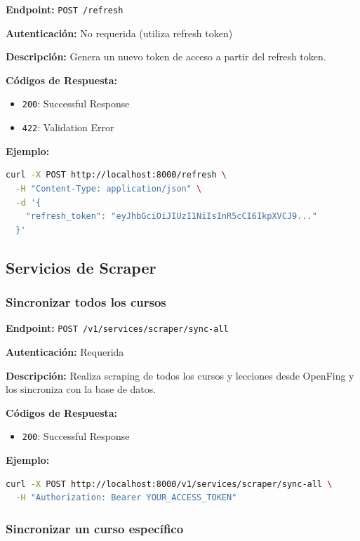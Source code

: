 \textbf{Endpoint:} \texttt{POST /refresh}

\textbf{Autenticación:} No requerida (utiliza refresh token)

\textbf{Descripción:} Genera un nuevo token de acceso a partir del refresh token.

\textbf{Códigos de Respuesta:}
\begin{itemize}
    \item \texttt{200}: Successful Response
    \item \texttt{422}: Validation Error
\end{itemize}

\textbf{Ejemplo:}

\begin{lstlisting}[language=bash]
curl -X POST http://localhost:8000/refresh \
  -H "Content-Type: application/json" \
  -d '{
    "refresh_token": "eyJhbGciOiJIUzI1NiIsInR5cCI6IkpXVCJ9..."
  }'
\end{lstlisting}

\subsection{Servicios de Scraper}
\label{subsection:A-3-Servicios de Scraper}

\subsubsection{Sincronizar todos los cursos}
\label{subsubsection:A-3-Sincronizar todos los cursos}

\textbf{Endpoint:} \texttt{POST /v1/services/scraper/sync-all}

\textbf{Autenticación:} Requerida

\textbf{Descripción:} Realiza scraping de todos los cursos y lecciones desde OpenFing y los sincroniza con la base de datos.

\textbf{Códigos de Respuesta:}
\begin{itemize}
    \item \texttt{200}: Successful Response
\end{itemize}

\textbf{Ejemplo:}

\begin{lstlisting}[language=bash]
curl -X POST http://localhost:8000/v1/services/scraper/sync-all \
  -H "Authorization: Bearer YOUR_ACCESS_TOKEN"
\end{lstlisting}

\subsubsection{Sincronizar un curso específico}
\label{subsubsection:A-3-Sincronizar un curso específico}


